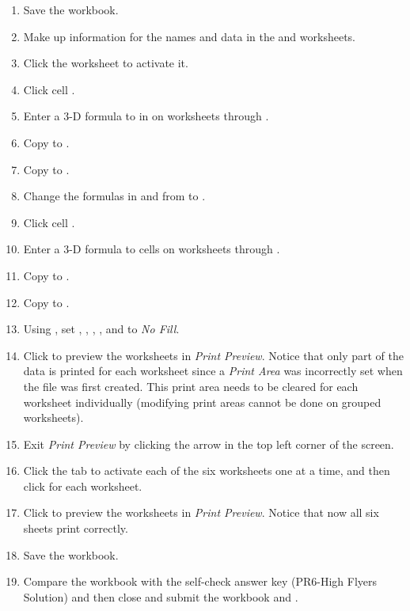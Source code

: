 \begin{enumbox}
	\begin{enumerate}
		\item Save the  workbook.
		\item Make up information for the names and data in the  and  worksheets.
		\item Click the  worksheet to activate it.
	
		\item Click cell . 
		\item Enter a $ 3 $-D formula to  in  on worksheets  through . 
		\item Copy  to .
		\item Copy  to .
		\item Change the formulas in  and  from  to .
		\item Click cell . 
		\item Enter a $ 3 $-D formula to  cells  on worksheets  through . 
		\item Copy  to .
		\item Copy  to .
		\item Using , set , , , , and  to \textit{No Fill}. 
		\item Click  to preview the worksheets in \textit{Print Preview}. Notice that only part of the data is printed for each worksheet since a \textit{Print Area} was incorrectly set when the file was first created. This print area needs to be cleared for each worksheet individually (modifying print areas cannot be done on grouped worksheets). 
		\item Exit \textit{Print Preview} by clicking the arrow in the top left corner of the screen. 
		\item Click the tab to activate each of the six worksheets one at a time, and then click  for each worksheet.
		\item Click  to preview the worksheets in \textit{Print Preview}. Notice that now all six sheets print correctly.
		\item Save the  workbook.
		\item Compare the workbook with the self-check answer key (PR6-High Flyers Solution) and then close and submit the  workbook and .
	\end{enumerate}
\end{enumbox}
	
